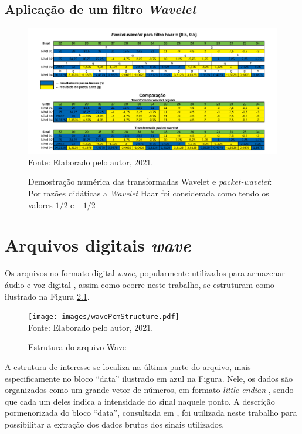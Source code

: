 \begin{apendicesenv}
	\partapendices
	\begin{landscape}
		\chapter{Aplicação de um filtro \textit{Wavelet}}
		\begin{figure}[H]
			\centering
			\caption{Demostração numérica das transformadas Wavelet e \textit{packet-wavelet}: Por razões didáticas a \textit{Wavelet} Haar foi considerada como tendo os valores $1/2$ e $-1/2$}
			\includegraphics[width=.85\linewidth]{images/haarWaveletExamples.pdf}
			\label{fig:haarWaveletExamples}
			\\Fonte: Elaborado pelo autor, 2021.
		\end{figure}
	\end{landscape}

	\chapter{Arquivos digitais \textit{wave}}
		\label{chap:waveFile}
		\par Os arquivos no formato digital \textit{wave}, popularmente utilizados para armazenar áudio e voz digital \cite{WAVE2019}, assim como ocorre neste trabalho, se estruturam como ilustrado na Figura \ref{fig:wavePcmStructure}.
		
		\begin{figure}[h]
			\centering
			\caption{Estrutura do arquivo Wave}
			\texttt{[image: images/wavePcmStructure.pdf]}
			\label{fig:wavePcmStructure}
			\\Fonte: Elaborado pelo autor, 2021.
		\end{figure}
		
		\par A estrutura de interesse se localiza na última parte do arquivo, mais especificamente no bloco ``data'' ilustrado em azul na Figura. Nele, os dados são organizados como um grande vetor de números, em formato \textit{little endian} \cite{adiga2007writing}, sendo que cada um deles indica a intensidade do sinal naquele ponto. A descrição pormenorizada do bloco ``data'', consultada em \cite{microsoftIbmWaveSpec}, foi utilizada neste trabalho para possibilitar a extração dos dados brutos dos sinais utilizados. 


\end{apendicesenv}

